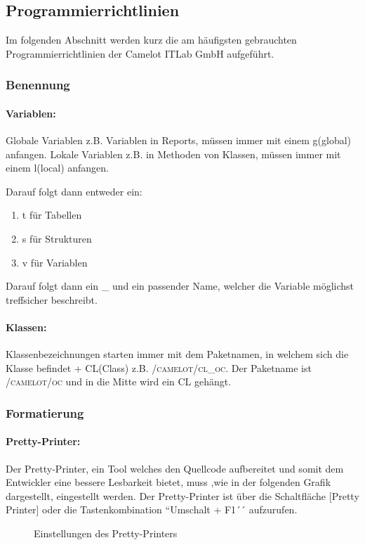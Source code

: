 \subsection{Programmierrichtlinien}
\label{app:Programmierrichtlinien}
Im folgenden Abschnitt werden kurz die am häufigsten gebrauchten Programmierrichtlinien der Camelot ITLab GmbH aufgeführt.

\subsubsection{Benennung}
\label{Benennung}
\paragraph{Variablen:}
Globale Variablen z.B. Variablen in Reports, müssen immer mit einem g(global) anfangen. 
Lokale Variablen z.B. in Methoden von Klassen, müssen immer mit einem l(local) anfangen.

Darauf folgt dann entweder ein:
\begin{enumerate}
	\item t für Tabellen
	\item s für Strukturen
	\item v für Variablen
\end{enumerate}
	
Darauf folgt dann ein \_ und ein passender Name, welcher die Variable möglichst treffsicher beschreibt.

\paragraph{Klassen:}
Klassenbezeichnungen starten immer mit dem Paketnamen, in welchem sich die Klasse befindet + CL(Class) z.B. \textsc{/camelot/cl\_oc}. Der Paketname ist \textsc{/camelot/oc} und in die Mitte wird ein CL gehängt.

\subsubsection{Formatierung}
\label{Formatierung}
\paragraph{Pretty-Printer:}
Der Pretty-Printer, ein Tool welches den Quellcode aufbereitet und somit dem Entwickler eine bessere Lesbarkeit bietet, muss ,wie in der folgenden Grafik dargestellt, eingestellt werden. Der Pretty-Printer ist über die Schaltfläche [Pretty Printer] oder die Tastenkombination ``Umschalt + F1´´ aufzurufen.
\begin{figure}[htb]
	\centering
	\caption{Einstellungen des Pretty-Printers}
\end{figure}



	

